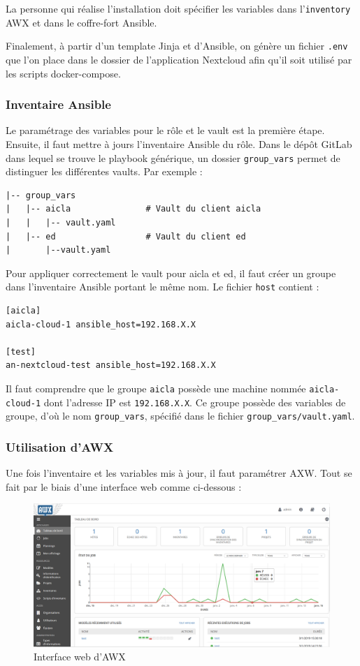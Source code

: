 \documentclass[12pt]{article}
\begin{document}
La personne qui réalise l'installation doit spécifier les variables dans l'\verb|inventory| AWX et dans le coffre-fort Ansible.

Finalement, à partir d'un template Jinja et d'Ansible, on génère un fichier \verb|.env| que l'on place dans le dossier de l'application Nextcloud afin qu'il soit utilisé par les scripts docker-compose.

\subsubsection{Inventaire Ansible}
Le paramétrage des variables pour le rôle et le vault est la première étape. 
Ensuite, il faut mettre à jours l'inventaire Ansible du rôle. Dans le dépôt GitLab dans lequel se trouve le playbook générique, un dossier \verb|group_vars| permet de distinguer les différentes vaults.
Par exemple :
\begin{verbatim}
|-- group_vars
|   |-- aicla               # Vault du client aicla
|   |   |-- vault.yaml
|   |-- ed                  # Vault du client ed
|       |--vault.yaml
\end{verbatim}

Pour appliquer correctement le vault pour aicla et ed, il faut créer un groupe dans l'inventaire Ansible portant le même nom. 
Le fichier \verb|host| contient :
\begin{verbatim}
[aicla]
aicla-cloud-1 ansible_host=192.168.X.X

[test]
an-nextcloud-test ansible_host=192.168.X.X
\end{verbatim}

Il faut comprendre que le groupe \verb|aicla| possède une machine nommée \verb|aicla-cloud-1| dont l'adresse IP est \verb|192.168.X.X|. 
Ce groupe possède des variables de groupe, d'où le nom \verb|group_vars|, spécifié dans le fichier \verb|group_vars/vault.yaml|.

\subsubsection{Utilisation d'AWX}
Une fois l'inventaire et les variables mis à jour, il faut paramétrer AXW. Tout se fait par le biais d'une interface web comme ci-dessous :
\begin{figure}[!ht]
    \centering
    \includegraphics[width=\textwidth]{src/awx.png}
    \caption{Interface web d'AWX}
    \label{fig:awx}
\end{figure}
\end{document}
